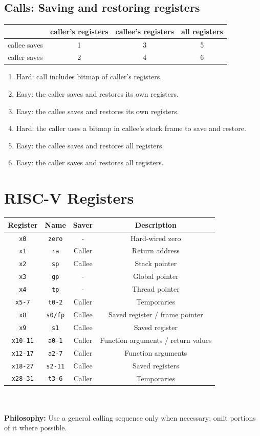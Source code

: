 \documentclass[10pt]{article}
\begin{document}
\subsection*{Calls: Saving and restoring registers}
\begin{tabular}{|c|c|c|c|}
    \hline
    & caller's registers & callee's registers & all registers \\
    \hline
    callee saves & 1 & 3 & 5\\
    caller saves & 2 & 4 & 6\\
    \hline
\end{tabular}
\begin{enumerate}
    \item Hard: call includes bitmap of caller's registers.
    \item Easy: the caller saves and restores its own registers.
    \item Easy: the callee saves and restores its own registers.
    \item Hard: the caller uses a bitmap in callee's stack frame to save and restore.
    \item Easy: the callee saves and restores all registers.
    \item Easy: the caller saves and restores all registers.
\end{enumerate}

\section*{RISC-V Registers}
\begin{tabular}{|c|c||c|c|}
\hline
Register & Name & Saver & Description \\
\hline
\texttt{x0} & \texttt{zero} & - & Hard-wired zero \\
\texttt{x1} & \texttt{ra} & Caller & Return address \\
\texttt{x2} & \texttt{sp} & Callee & Stack pointer \\
\texttt{x3} & \texttt{gp} & - & Global pointer \\
\texttt{x4} & \texttt{tp} & - & Thread pointer \\
\texttt{x5-7} & \texttt{t0-2} & Caller & Temporaries \\
\texttt{x8} & \texttt{s0/fp} & Callee & Saved register / frame pointer \\
\texttt{x9} & \texttt{s1} & Callee & Saved register \\
\texttt{x10-11} & \texttt{a0-1} & Caller & Function arguments / return values \\
\texttt{x12-17} & \texttt{a2-7} & Caller & Function arguments \\
\texttt{x18-27} & \texttt{s2-11} & Callee & Saved registers \\
\texttt{x28-31} & \texttt{t3-6} & Caller & Temporaries \\
\hline
\end{tabular}\\\\
\textbf{Philosophy:} Use a general calling sequence only when necessary; omit portions of it where possible.
\end{document}
